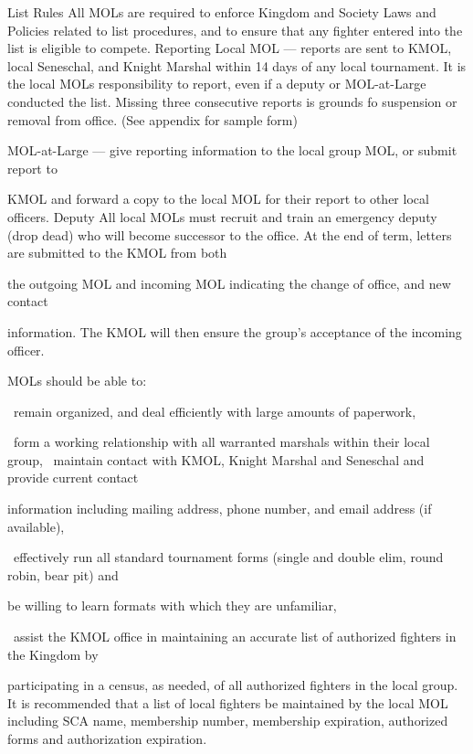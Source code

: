 \documentclass{article}
\begin{document}
List Rules All MOLs are required to enforce Kingdom and Society Laws and Policies related
to list procedures, and to ensure that any fighter entered into the list is eligible to compete.
Reporting Local MOL --- reports are sent to KMOL, local Seneschal, and Knight Marshal within 14
days of any local tournament. It is the local MOLs responsibility to report, even if a deputy
or MOL-at-Large conducted the list. Missing three consecutive reports is grounds fo
suspension or removal from office. (See appendix for sample form)






MOL-at-Large --- give reporting information to the local group MOL, or submit report to


KMOL and forward a copy to the local MOL for their report to other local officers.
Deputy All local MOLs must recruit and train an emergency deputy (drop dead) who will become
successor to the office. At the end of term, letters are submitted to the KMOL from both

the outgoing MOL and incoming MOL indicating the change of office, and new contact

information. The KMOL will then ensure the group’s acceptance of the incoming officer.


MOLs should be able to:

~remain organized, and deal efficiently with large amounts of paperwork,


~form a working relationship with all warranted marshals within their local group,
~maintain contact with KMOL, Knight Marshal and Seneschal and provide current contact

information including mailing address, phone number, and email address (if available),


~effectively run all standard tournament forms (single and double elim, round robin, bear pit) and


be willing to learn formats with which they are unfamiliar,

~assist the KMOL office in maintaining an accurate list of authorized fighters in the Kingdom by



participating in a census, as needed, of all authorized fighters in the local group. It is
recommended that a list of local fighters be maintained by the local MOL including SCA name,
membership number, membership expiration, authorized forms and authorization expiration.
\end{document}
